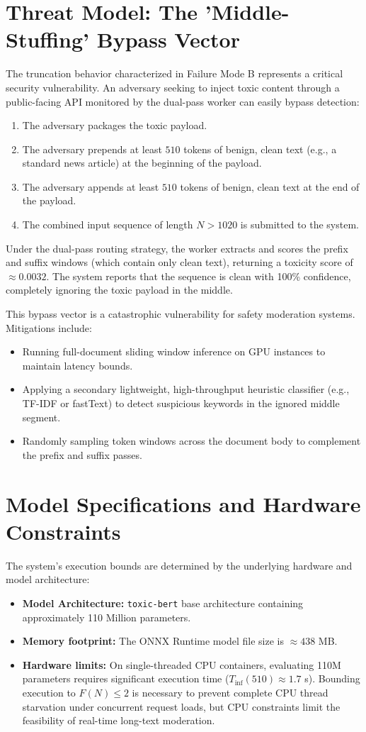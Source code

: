 \documentclass[10pt]{article}
\begin{document}
\section{Threat Model: The 'Middle-Stuffing' Bypass Vector}
The truncation behavior characterized in Failure Mode B represents a critical security vulnerability. An adversary seeking to inject toxic content through a public-facing API monitored by the dual-pass worker can easily bypass detection:
\begin{enumerate}
\item The adversary packages the toxic payload.
\item The adversary prepends at least $510$ tokens of benign, clean text (e.g., a standard news article) at the beginning of the payload.
\item The adversary appends at least $510$ tokens of benign, clean text at the end of the payload.
\item The combined input sequence of length $N > 1020$ is submitted to the system.
\end{enumerate}
Under the dual-pass routing strategy, the worker extracts and scores the prefix and suffix windows (which contain only clean text), returning a toxicity score of $\approx 0.0032$. The system reports that the sequence is clean with 100\% confidence, completely ignoring the toxic payload in the middle. 

This bypass vector is a catastrophic vulnerability for safety moderation systems. Mitigations include:
\begin{itemize}
\item Running full-document sliding window inference on GPU instances to maintain latency bounds.
\item Applying a secondary lightweight, high-throughput heuristic classifier (e.g., TF-IDF or fastText) to detect suspicious keywords in the ignored middle segment.
\item Randomly sampling token windows across the document body to complement the prefix and suffix passes.
\end{itemize}

\section{Model Specifications and Hardware Constraints}
The system's execution bounds are determined by the underlying hardware and model architecture:
\begin{itemize}
\item \textbf{Model Architecture:} \texttt{toxic-bert} base architecture containing approximately 110 Million parameters.
\item \textbf{Memory footprint:} The ONNX Runtime model file size is $\approx 438$ MB.
\item \textbf{Hardware limits:} On single-threaded CPU containers, evaluating 110M parameters requires significant execution time ($T_{\text{inf}}(510) \approx 1.7$ s). Bounding execution to $F(N) \le 2$ is necessary to prevent complete CPU thread starvation under concurrent request loads, but CPU constraints limit the feasibility of real-time long-text moderation.
\end{itemize}
\end{document}
